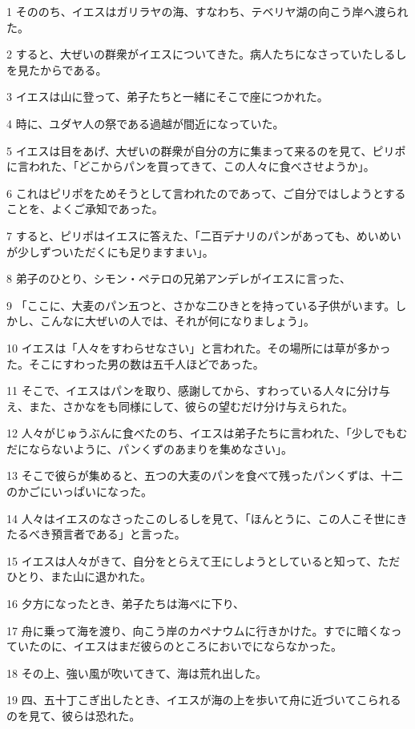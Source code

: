 \par 1 そののち、イエスはガリラヤの海、すなわち、テベリヤ湖の向こう岸へ渡られた。
\par 2 すると、大ぜいの群衆がイエスについてきた。病人たちになさっていたしるしを見たからである。
\par 3 イエスは山に登って、弟子たちと一緒にそこで座につかれた。
\par 4 時に、ユダヤ人の祭である過越が間近になっていた。
\par 5 イエスは目をあげ、大ぜいの群衆が自分の方に集まって来るのを見て、ピリポに言われた、「どこからパンを買ってきて、この人々に食べさせようか」。
\par 6 これはピリポをためそうとして言われたのであって、ご自分ではしようとすることを、よくご承知であった。
\par 7 すると、ピリポはイエスに答えた、「二百デナリのパンがあっても、めいめいが少しずついただくにも足りますまい」。
\par 8 弟子のひとり、シモン・ペテロの兄弟アンデレがイエスに言った、
\par 9 「ここに、大麦のパン五つと、さかな二ひきとを持っている子供がいます。しかし、こんなに大ぜいの人では、それが何になりましょう」。
\par 10 イエスは「人々をすわらせなさい」と言われた。その場所には草が多かった。そこにすわった男の数は五千人ほどであった。
\par 11 そこで、イエスはパンを取り、感謝してから、すわっている人々に分け与え、また、さかなをも同様にして、彼らの望むだけ分け与えられた。
\par 12 人々がじゅうぶんに食べたのち、イエスは弟子たちに言われた、「少しでもむだにならないように、パンくずのあまりを集めなさい」。
\par 13 そこで彼らが集めると、五つの大麦のパンを食べて残ったパンくずは、十二のかごにいっぱいになった。
\par 14 人々はイエスのなさったこのしるしを見て、「ほんとうに、この人こそ世にきたるべき預言者である」と言った。
\par 15 イエスは人々がきて、自分をとらえて王にしようとしていると知って、ただひとり、また山に退かれた。
\par 16 夕方になったとき、弟子たちは海べに下り、
\par 17 舟に乗って海を渡り、向こう岸のカペナウムに行きかけた。すでに暗くなっていたのに、イエスはまだ彼らのところにおいでにならなかった。
\par 18 その上、強い風が吹いてきて、海は荒れ出した。
\par 19 四、五十丁こぎ出したとき、イエスが海の上を歩いて舟に近づいてこられるのを見て、彼らは恐れた。
